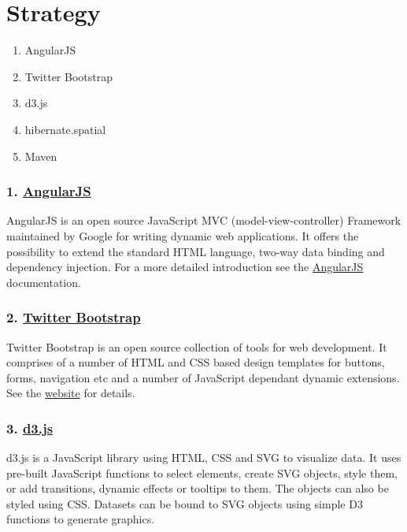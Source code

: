 
\section{Strategy}

\begin{enumerate}
\def\labelenumi{\arabic{enumi}.}
\itemsep1pt\parskip0pt
\item
  AngularJS
\item
  Twitter Bootstrap
\item
  d3.js
\item
  hibernate.spatial
\item
  Maven
\end{enumerate}

\subsubsection{1.
\href{http://angularjs.org/}{\textbf{AngularJS}}}\label{angularjs}

AngularJS is an open source JavaScript MVC (model-view-controller)
Framework maintained by Google for writing dynamic web applications. It
offers the possibility to extend the standard HTML language, two-way
data binding and dependency injection. For a more detailed introduction
see the \href{http://docs.angularjs.org/guide/introduction}{AngularJS}
documentation.

\subsubsection{2.
\href{http://getbootstrap.com/components/}{\textbf{Twitter
Bootstrap}}}\label{twitter-bootstrap}

Twitter Bootstrap is an open source collection of tools for web
development. It comprises of a number of HTML and CSS based design
templates for buttons, forms, navigation etc and a number of JavaScript
dependant dynamic extensions. See the
\href{http://getbootstrap.com/}{website} for details.

\subsubsection{3. \href{http://d3js.org/}{\textbf{d3.js}}}\label{d3.js}

d3.js is a JavaScript library using HTML, CSS and SVG to visualize data.
It uses pre-built JavaScript functions to select elements, create SVG
objects, style them, or add transitions, dynamic effects or tooltips to
them. The objects can also be styled using CSS. Datasets can be bound to
SVG objects using simple D3 functions to generate graphics.

